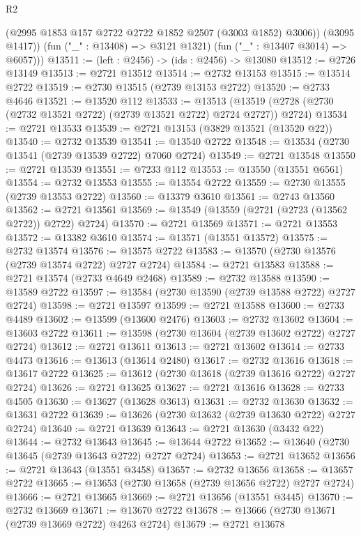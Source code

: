 \begin{lexlean}{R2}
\begin{coremodule}
            (@2995 @1853 @157 @2722 @2722 @1852 @2507 (@3003 @1852) @3006))
          (@3095 @1417))
        (fun ("_" : @13408) => @3121 @1321)
        (fun ("_" : @13407 @3014) => @6057)))
@13511 := (left : @2456) -> (ids : @2456) -> @13080
@13512 := @2726 @13149
@13513 := @2721 @13512
@13514 := @2732 @13153
@13515 := @13514 @2722
@13519 := @2730 @13515 (@2739 @13153 @2722)
@13520 := @2733 @4646
@13521 := @13520 @112
@13533 := @13513
    (@13519 (@2728 (@2730 (@2732 @13521 @2722) (@2739 @13521 @2722) @2724 @2727)) @2724)
@13534 := @2721 @13533
@13539 := @2721 @13153 (@3829 @13521 (@13520 @22))
@13540 := @2732 @13539
@13541 := @13540 @2722
@13548 := @13534 (@2730 @13541 (@2739 @13539 @2722) @7060 @2724)
@13549 := @2721 @13548
@13550 := @2721 @13539
@13551 := @7233 @112
@13553 := @13550 (@13551 @6561)
@13554 := @2732 @13553
@13555 := @13554 @2722
@13559 := @2730 @13555 (@2739 @13553 @2722)
@13560 := @13379 @3610
@13561 := @2743 @13560
@13562 := @2721 @13561
@13569 := @13549 (@13559 (@2721 (@2723 (@13562 @2722)) @2722) @2724)
@13570 := @2721 @13569
@13571 := @2721 @13553
@13572 := @13382 @3610
@13574 := @13571 (@13551 @13572)
@13575 := @2732 @13574
@13576 := @13575 @2722
@13583 := @13570 (@2730 @13576 (@2739 @13574 @2722) @2727 @2724)
@13584 := @2721 @13583
@13588 := @2721 @13574 (@2733 @4649 @2468)
@13589 := @2732 @13588
@13590 := @13589 @2722
@13597 := @13584 (@2730 @13590 (@2739 @13588 @2722) @2727 @2724)
@13598 := @2721 @13597
@13599 := @2721 @13588
@13600 := @2733 @4489
@13602 := @13599 (@13600 @2476)
@13603 := @2732 @13602
@13604 := @13603 @2722
@13611 := @13598 (@2730 @13604 (@2739 @13602 @2722) @2727 @2724)
@13612 := @2721 @13611
@13613 := @2721 @13602
@13614 := @2733 @4473
@13616 := @13613 (@13614 @2480)
@13617 := @2732 @13616
@13618 := @13617 @2722
@13625 := @13612 (@2730 @13618 (@2739 @13616 @2722) @2727 @2724)
@13626 := @2721 @13625
@13627 := @2721 @13616
@13628 := @2733 @4505
@13630 := @13627 (@13628 @3613)
@13631 := @2732 @13630
@13632 := @13631 @2722
@13639 := @13626 (@2730 @13632 (@2739 @13630 @2722) @2727 @2724)
@13640 := @2721 @13639
@13643 := @2721 @13630 (@3432 @22)
@13644 := @2732 @13643
@13645 := @13644 @2722
@13652 := @13640 (@2730 @13645 (@2739 @13643 @2722) @2727 @2724)
@13653 := @2721 @13652
@13656 := @2721 @13643 (@13551 @3458)
@13657 := @2732 @13656
@13658 := @13657 @2722
@13665 := @13653 (@2730 @13658 (@2739 @13656 @2722) @2727 @2724)
@13666 := @2721 @13665
@13669 := @2721 @13656 (@13551 @3445)
@13670 := @2732 @13669
@13671 := @13670 @2722
@13678 := @13666 (@2730 @13671 (@2739 @13669 @2722) @4263 @2724)
@13679 := @2721 @13678

\end{coremodule}
\end{lexlean}
